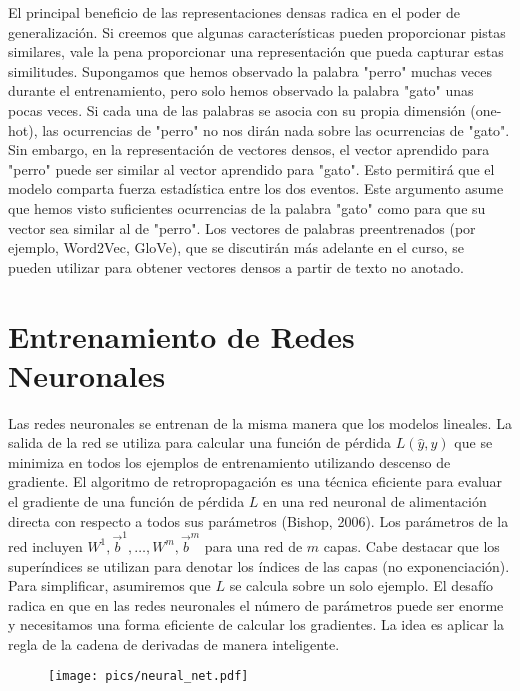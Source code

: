 El principal beneficio de las representaciones densas radica en el poder de generalización. Si creemos que algunas características pueden proporcionar pistas similares, vale la pena proporcionar una representación que pueda capturar estas similitudes. Supongamos que hemos observado la palabra "perro" muchas veces durante el entrenamiento, pero solo hemos observado la palabra "gato" unas pocas veces. Si cada una de las palabras se asocia con su propia dimensión (one-hot), las ocurrencias de "perro" no nos dirán nada sobre las ocurrencias de "gato". Sin embargo, en la representación de vectores densos, el vector aprendido para "perro" puede ser similar al vector aprendido para "gato". Esto permitirá que el modelo comparta fuerza estadística entre los dos eventos. Este argumento asume que hemos visto suficientes ocurrencias de la palabra "gato" como para que su vector sea similar al de "perro". Los vectores de palabras preentrenados (por ejemplo, Word2Vec, GloVe), que se discutirán más adelante en el curso, se pueden utilizar para obtener vectores densos a partir de texto no anotado.



\section{Entrenamiento de Redes Neuronales}

Las redes neuronales se entrenan de la misma manera que los modelos lineales. La salida de la red se utiliza para calcular una función de pérdida $L(\hat{y},y)$ que se minimiza en todos los ejemplos de entrenamiento utilizando descenso de gradiente. El algoritmo de retropropagación es una técnica eficiente para evaluar el gradiente de una función de pérdida $L$ en una red neuronal de alimentación directa con respecto a todos sus parámetros (Bishop, 2006). Los parámetros de la red incluyen $W^1, \vec{b}^1, \dots, W^m, \vec{b}^m$ para una red de $m$ capas. Cabe destacar que los superíndices se utilizan para denotar los índices de las capas (no exponenciación). Para simplificar, asumiremos que $L$ se calcula sobre un solo ejemplo. El desafío radica en que en las redes neuronales el número de parámetros puede ser enorme y necesitamos una forma eficiente de calcular los gradientes. La idea es aplicar la regla de la cadena de derivadas de manera inteligente.

\begin{figure}[htb]
	\centering
	 \texttt{[image: pics/neural\_net.pdf]}
\end{figure}

